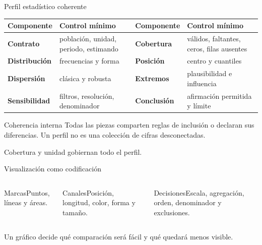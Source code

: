 \documentclass[aspectratio=169,11pt]{beamer}
\newcommand{\br}{\\}
\begin{document}
\begin{frame}{Perfil estadístico coherente}
  \footnotesize
  \begin{tabularx}{\textwidth}{>{\bfseries}p{} X >{\bfseries}p{} X}
    \toprule
    Componente & Control mínimo & Componente & Control mínimo \\
    \midrule
    Contrato & población, unidad, periodo, estimando & Cobertura & válidos, faltantes, ceros, filas ausentes \\
    Distribución & frecuencias y forma & Posición & centro y cuantiles \\
    Dispersión & clásica y robusta & Extremos & plausibilidad e influencia \\
    Sensibilidad & filtros, resolución, denominador & Conclusión & afirmación permitida y límite \\
    \bottomrule
  \end{tabularx}
  \vspace{.8em}
  \begin{block}{Coherencia interna}
    Todas las piezas comparten reglas de inclusión o declaran sus diferencias. Un perfil no es una colección de cifras desconectadas.
  \end{block}
  \centering\alert{Cobertura y unidad gobiernan todo el perfil.}
\end{frame}

\begin{frame}{Visualización como codificación}
  \centering
  \vspace{.8em}
  \begin{columns}[T]
      \begin{block}{Marcas}Puntos, líneas y áreas.\end{block}
      \begin{block}{Canales}Posición, longitud, color, forma y tamaño.\end{block}
      \begin{block}{Decisiones}Escala, agregación, orden, denominador y exclusiones.\end{block}
  \end{columns}
  \vfill
  \centering Un gráfico decide qué comparación será fácil y qué quedará menos visible.
\end{frame}
\end{document}
